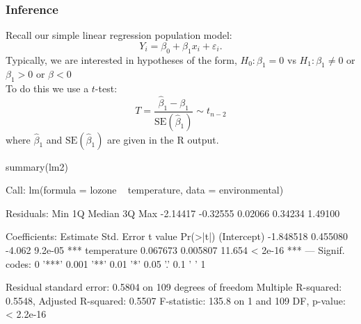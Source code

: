 \documentclass[a4paper]{article}
\begin{document}
\subsubsection{Inference}
Recall our simple linear regression population model:
\[
	Y_i = \beta_0 + \beta_1 x_i + \varepsilon_i.
\]
Typically, we are interested in hypotheses of the form, \( H_0: \beta_1 = 0 \) vs \( H_1: \beta_1 \neq 0 \) or \( \beta_1 > 0 \) or \( \beta < 0 \)\\
To do this we use a \( t \)-test:
\[
	T = \frac{\hat{\beta}_1 - \beta_1}{\text{SE}(\hat{\beta}_1)} \sim t_{n-2}
\]
where \( \hat{\beta}_1 \) and \( \text{SE}(\hat{\beta}_1) \) are given in the R output.
\begin{Schunk}
\begin{Sinput}
summary(lm2)
\end{Sinput}
\begin{Soutput}

Call:
lm(formula = lozone ~ temperature, data = environmental)

Residuals:
     Min       1Q   Median       3Q      Max 
-2.14417 -0.32555  0.02066  0.34234  1.49100 

Coefficients:
             Estimate Std. Error t value Pr(>|t|)    
(Intercept) -1.848518   0.455080  -4.062  9.2e-05 ***
temperature  0.067673   0.005807  11.654  < 2e-16 ***
---
Signif. codes:  0 '***' 0.001 '**' 0.01 '*' 0.05 '.' 0.1 ' ' 1

Residual standard error: 0.5804 on 109 degrees of freedom
Multiple R-squared:  0.5548,	Adjusted R-squared:  0.5507 
F-statistic: 135.8 on 1 and 109 DF,  p-value: < 2.2e-16
\end{Soutput}
\end{Schunk}
\end{document}
